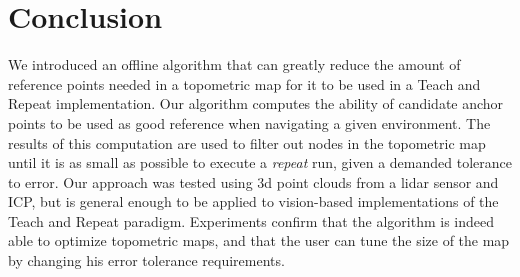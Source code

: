 \documentclass[letterpaper,10 pt,conference]{ieeeconf}
\begin{document}
\section{Conclusion}

We introduced an offline algorithm that can greatly reduce the amount of reference points needed in
a topometric map for it to be used in a Teach and Repeat implementation. Our algorithm computes the
ability of candidate anchor points to be used as good reference when navigating a given
environment. The results of this computation are used to filter out nodes in the topometric map
until it is as small as possible to execute a \textit{repeat} run, given a demanded tolerance to
error. Our approach was tested using 3d point clouds from a lidar sensor and ICP, but is general
enough to be applied to vision-based implementations of the Teach and Repeat paradigm. Experiments
confirm that the algorithm is indeed able to optimize topometric maps, and that the user can tune
the size of the map by changing his error tolerance requirements.

\printbibliography
\end{document}
